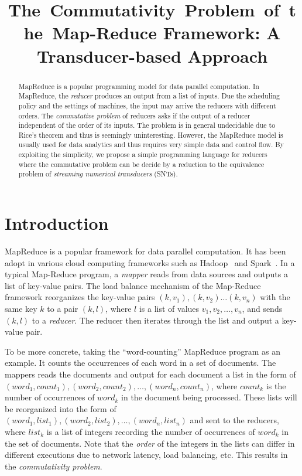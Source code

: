 \documentclass[runningheads,a4paper]{llncs}
\title{The~Commutativity~Problem~of~the~Map-Reduce Framework: A Transducer-based Approach}
\author{}
\institute{}
\begin{document}
\maketitle

\begin{abstract}

MapReduce is a popular programming model for data parallel computation. 
In MapReduce, the \emph{reducer} produces an output from a list of inputs. Due the scheduling policy and the settings of machines, the input may arrive the reducers with different orders. The \emph{commutative problem} of reducers asks if the output of a reducer independent of the order of its inputs. The problem is in general undecidable due to Rice's theorem and thus is seemingly uninteresting. However, the MapReduce model is usually used for data analytics and thus requires very simple data and control flow. 
By exploiting the simplicity, we propose a simple programming language for reducers where the commutative problem can be decide by a reduction to the equivalence problem of \emph{streaming numerical transducers} (SNTs). 
\end{abstract}

\section{Introduction}
MapReduce is a  popular framework for data parallel computation. It has been adopt in various cloud computing frameworks such as Hadoop~\cite{Hadoop} and Spark~\cite{Spark}. In a typical Map-Reduce program, a \emph{mapper} reads from data sources and outputs a list of key-value pairs. 
The load balance mechanism of the Map-Reduce framework reorganizes the key-value pairs $(k, v_1), (k,v_2)\ldots(k,v_n)$ with the same key $k$ to a pair $(k,l)$, where $l$ is a list of values $v_1,v_2,\ldots,v_n$, and sends $(k,l)$ to a \emph{reducer}. The reducer then iterates through the list and output a key-value pair.

To be more concrete, taking the ``word-counting'' MapReduce program as an example. It counts the occurrences of each word in a set of documents. The mappers reads the documents and output for each document a list in the form of $(word_1, count_1), (word_2, count_2), \ldots, (word_n, count_n)$, where $count_k$ is the number of occurrences of $word_k$ in the document being processed. These lists will be reorganized into the form of $(word_1, list_1), (word_2,list_2), \ldots, (word_n,list_n)$ and sent to the reducers, where $list_k$ is a list of integers recording the number of occurrences of $word_k$ in the set of documents. Note that the \emph{order} of the integers in the lists can differ in different executions due to network latency, load balancing, etc.
This results in the \emph{commutativity problem}.
\end{document}
